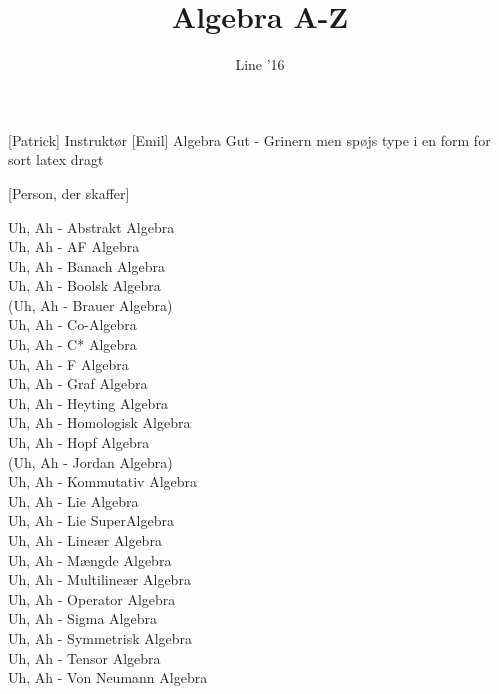\documentclass[a4paper,11pt]{article}
\title{Algebra A-Z}
\author{Line '16}
\begin{document}
\maketitle

\begin{roles}
[Patrick] Instruktør
[Emil] Algebra Gut - Grinern men spøjs type i en form for sort latex dragt
\end{roles}

\begin{props}
[Person, der skaffer]
\end{props}

\begin{sketch}



 Uh, Ah - Abstrakt Algebra \\
Uh, Ah - AF Algebra \\
Uh, Ah - Banach Algebra \\
Uh, Ah - Boolsk Algebra \\
(Uh, Ah - Brauer Algebra) \\
Uh, Ah - Co-Algebra \\
Uh, Ah - C* Algebra \\
Uh, Ah - F Algebra \\
Uh, Ah - Graf Algebra \\
Uh, Ah - Heyting Algebra \\
Uh, Ah - Homologisk Algebra \\
Uh, Ah - Hopf Algebra \\
(Uh, Ah - Jordan Algebra) \\
Uh, Ah - Kommutativ Algebra \\
Uh, Ah - Lie Algebra \\
Uh, Ah - Lie SuperAlgebra \\
Uh, Ah - Lineær Algebra \\
Uh, Ah - Mængde Algebra \\
Uh, Ah - Multilineær Algebra \\
Uh, Ah - Operator Algebra \\
Uh, Ah - Sigma Algebra \\
Uh, Ah - Symmetrisk Algebra \\
Uh, Ah - Tensor Algebra \\
Uh, Ah - Von Neumann Algebra

\end{sketch}
\end{document}
